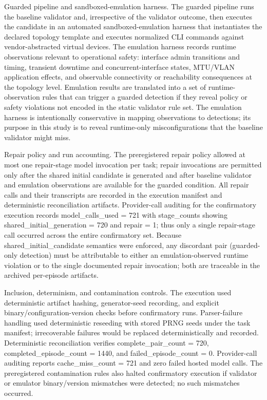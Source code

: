\documentclass[conference]{IEEEtran}
\begin{document}
Guarded pipeline and sandboxed-emulation harness. The guarded pipeline runs the baseline validator and, irrespective of the validator outcome, then executes the candidate in an automated sandboxed-emulation harness that instantiates the declared topology template and executes normalized CLI commands against vendor-abstracted virtual devices. The emulation harness records runtime observations relevant to operational safety: interface admin transitions and timing, transient downtime and concurrent-interface states, MTU/VLAN application effects, and observable connectivity or reachability consequences at the topology level. Emulation results are translated into a set of runtime-observation rules that can trigger a guarded detection if they reveal policy or safety violations not encoded in the static validator rule set. The emulation harness is intentionally conservative in mapping observations to detections; its purpose in this study is to reveal runtime-only misconfigurations that the baseline validator might miss.

Repair policy and run accounting. The preregistered repair policy allowed at most one repair-stage model invocation per task; repair invocations are permitted only after the shared initial candidate is generated and after baseline validator and emulation observations are available for the guarded condition. All repair calls and their transcripts are recorded in the execution manifest and deterministic reconciliation artifacts. Provider-call auditing for the confirmatory execution records model\_calls\_used = 721 with stage\_counts showing shared\_initial\_generation = 720 and repair = 1; thus only a single repair-stage call occurred across the entire confirmatory set. Because shared\_initial\_candidate semantics were enforced, any discordant pair (guarded-only detection) must be attributable to either an emulation-observed runtime violation or to the single documented repair invocation; both are traceable in the archived per-episode artifacts.

Inclusion, determinism, and contamination controls. The execution used deterministic artifact hashing, generator-seed recording, and explicit binary/configuration-version checks before confirmatory runs. Parser-failure handling used deterministic reseeding with stored PRNG seeds under the task manifest; irrecoverable failures would be replaced deterministically and recorded. Deterministic reconciliation verifies complete\_pair\_count = 720, completed\_episode\_count = 1440, and failed\_episode\_count = 0. Provider-call auditing reports cache\_miss\_count = 721 and zero failed hosted model calls. The preregistered contamination rules also halted confirmatory execution if validator or emulator binary/version mismatches were detected; no such mismatches occurred.
\end{document}
